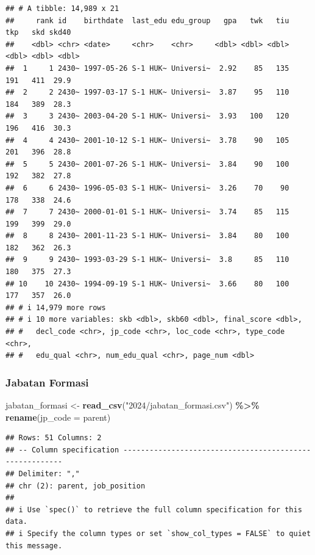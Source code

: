 \documentclass[
]{article}
\newenvironment{Shaded}{\begin{snugshade}}{\end{snugshade}}
\newcommand{\AttributeTok}[1]{\textcolor[rgb]{0.13,0.29,0.53}{#1}}
\newcommand{\FunctionTok}[1]{\textcolor[rgb]{0.13,0.29,0.53}{\textbf{#1}}}
\newcommand{\NormalTok}[1]{#1}
\newcommand{\OtherTok}[1]{\textcolor[rgb]{0.56,0.35,0.01}{#1}}
\newcommand{\SpecialCharTok}[1]{\textcolor[rgb]{0.81,0.36,0.00}{\textbf{#1}}}
\newcommand{\StringTok}[1]{\textcolor[rgb]{0.31,0.60,0.02}{#1}}
\begin{document}
\begin{verbatim}
## # A tibble: 14,989 x 21
##     rank id    birthdate  last_edu edu_group   gpa   twk   tiu   tkp   skd skd40
##    <dbl> <chr> <date>     <chr>    <chr>     <dbl> <dbl> <dbl> <dbl> <dbl> <dbl>
##  1     1 2430~ 1997-05-26 S-1 HUK~ Universi~  2.92    85   135   191   411  29.9
##  2     2 2430~ 1997-03-17 S-1 HUK~ Universi~  3.87    95   110   184   389  28.3
##  3     3 2430~ 2003-04-20 S-1 HUK~ Universi~  3.93   100   120   196   416  30.3
##  4     4 2430~ 2001-10-12 S-1 HUK~ Universi~  3.78    90   105   201   396  28.8
##  5     5 2430~ 2001-07-26 S-1 HUK~ Universi~  3.84    90   100   192   382  27.8
##  6     6 2430~ 1996-05-03 S-1 HUK~ Universi~  3.26    70    90   178   338  24.6
##  7     7 2430~ 2000-01-01 S-1 HUK~ Universi~  3.74    85   115   199   399  29.0
##  8     8 2430~ 2001-11-23 S-1 HUK~ Universi~  3.84    80   100   182   362  26.3
##  9     9 2430~ 1993-03-29 S-1 HUK~ Universi~  3.8     85   110   180   375  27.3
## 10    10 2430~ 1994-09-19 S-1 HUK~ Universi~  3.66    80   100   177   357  26.0
## # i 14,979 more rows
## # i 10 more variables: skb <dbl>, skb60 <dbl>, final_score <dbl>,
## #   decl_code <chr>, jp_code <chr>, loc_code <chr>, type_code <chr>,
## #   edu_qual <chr>, num_edu_qual <chr>, page_num <dbl>
\end{verbatim}

\subsubsection{Jabatan Formasi}\label{jabatan-formasi}

\begin{Shaded}
\begin{Highlighting}[]
\NormalTok{jabatan\_formasi }\OtherTok{\textless{}{-}} \FunctionTok{read\_csv}\NormalTok{(}\StringTok{"2024/jabatan\_formasi.csv"}\NormalTok{) }\SpecialCharTok{\%\textgreater{}\%} 
  \FunctionTok{rename}\NormalTok{(}\AttributeTok{jp\_code =}\NormalTok{ parent)}
\end{Highlighting}
\end{Shaded}

\begin{verbatim}
## Rows: 51 Columns: 2
## -- Column specification --------------------------------------------------------
## Delimiter: ","
## chr (2): parent, job_position
## 
## i Use `spec()` to retrieve the full column specification for this data.
## i Specify the column types or set `show_col_types = FALSE` to quiet this message.
\end{verbatim}
\end{document}

